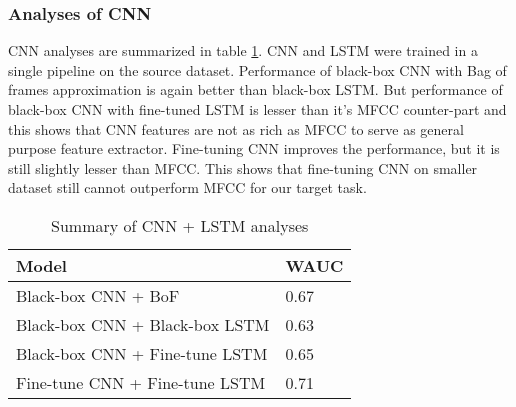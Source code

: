 \subsubsection{Analyses of CNN}
CNN analyses are summarized in table \ref{tab:a10}. CNN and LSTM were trained in a single pipeline on the source dataset. Performance of black-box CNN with Bag of frames approximation is again better than black-box LSTM. But performance of black-box CNN with fine-tuned LSTM is lesser than it's MFCC counter-part and this shows that CNN features are not as rich as MFCC to serve as general purpose feature extractor. Fine-tuning CNN improves the performance, but it is still slightly lesser than MFCC. This shows that fine-tuning CNN on smaller dataset still cannot outperform MFCC for our target task.
  
\begin{table}[H]
\label{tab:a10}
\centering
   \begin{tabular}{ | p{} | p{} |}
    \hline
    \textbf{Model} & \textbf{WAUC} \\ \hline
    Black-box CNN + BoF & 0.67 \\ \hline 
    Black-box CNN + Black-box LSTM & 0.63 \\ \hline 
    Black-box CNN + Fine-tune LSTM & 0.65 \\ \hline
    Fine-tune CNN + Fine-tune LSTM &  0.71 \\ \hline
    \hline
    \end{tabular}
    \caption{Summary of CNN + LSTM analyses}
\end{table}




